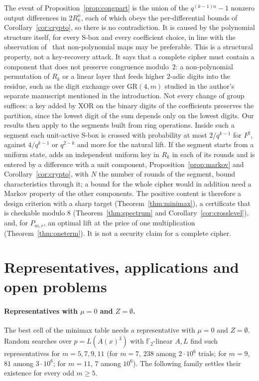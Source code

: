 \documentclass[11pt]{article}
\theoremstyle{definition}
\theoremstyle{remark}
\newcommand{\F}{\mathbb{F}}
\newcommand{\GR}{\mathrm{GR}}
\begin{document}
The event of Proposition~\ref{prop:congpart} is the union of the $q^{(k-1)n}-1$ nonzero output differences in
$2R_k^n$, each of which obeys the per-differential bounds of Corollary~\ref{cor:crypto}, so there is no contradiction.
It is caused by the polynomial structure itself, for every
S-box and every coefficient choice, in line with the observation of~\cite{RS} that non-polynomial maps may be
preferable. This is a structural property, not a key-recovery attack. It says that a complete cipher must contain a component that does
not preserve congruence modulo~$2$: a non-polynomial permutation of $R_k$ or a linear layer that feeds higher
$2$-adic digits into the residue, such as the digit exchange over $\GR(4,m)$ studied in the author's separate manuscript mentioned in the introduction. Not every
change of group suffices: a key added by XOR on the binary digits of the coefficients preserves the partition,
since the lowest digit of the sum depends only on the lowest digits. Our results then apply to the segments built
from ring operations. Inside such a segment each unit-active S-box is crossed with probability at most $2/q^{k-1}$ for
$F^\sharp$, against $4/q^{k-1}$ or $q^{2-k}$ and more for the natural lift. If the segment starts from a uniform
state, adds an independent uniform key in $R_k$ in each of its rounds and is entered by a difference with a unit
component, Proposition~\ref{prop:markov} and Corollary~\ref{cor:crypto}, with $N$ the number of rounds of the
segment, bound characteristics through it; a bound for the whole cipher would in addition need a Markov property of
the other components. The positive content is therefore a design criterion with a sharp target (Theorem~\ref{thm:minimax}), a
certificate that is checkable modulo $8$ (Theorem~\ref{thm:spectrum} and Corollary~\ref{cor:crosslevel}), and, for
$P_{m,r}$, an optimal lift at the price of one multiplication (Theorem~\ref{thm:oneterm}). It is not a security claim
for a complete cipher.

\section{Representatives, applications and open problems}\label{sec:discussion}

\paragraph{Representatives with $\mu=0$ and $Z=\emptyset$.}
The best cell of the minimax table needs a representative with $\mu=0$ and $Z=\emptyset$. Random searches over
$p=L(A(x)^3)$ with $\F_2$-linear $A,L$ find such representatives for $m=5,7,9,11$ (for $m=7$, $238$ among
$2\cdot10^6$ trials; for $m=9$, $81$ among $3\cdot10^6$; for $m=11$, $7$ among $10^6$). The following family settles
their existence for every odd $m\ge5$.
\end{document}
